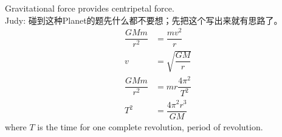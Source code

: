 \begin{center}
\end{center}
Gravitational force provides centripetal force. \\Judy: 碰到这种Planet的题先什么都不要想；先把这个写出来就有思路了。
\[\begin{aligned}
\dfrac{GMm}{r^2}&=\dfrac{mv^2}{r}\\
v&=\sqrt{\dfrac{GM}{r}}
\end{aligned}\] \[\begin{aligned}
\dfrac{GMm}{r^2}&=mr\dfrac{4\pi^2}{T^2}\\
T^2&=\dfrac{4\pi^2 r^3}{GM}
\end{aligned}\]
where $T$ is the time for one complete revolution, period of revolution.
